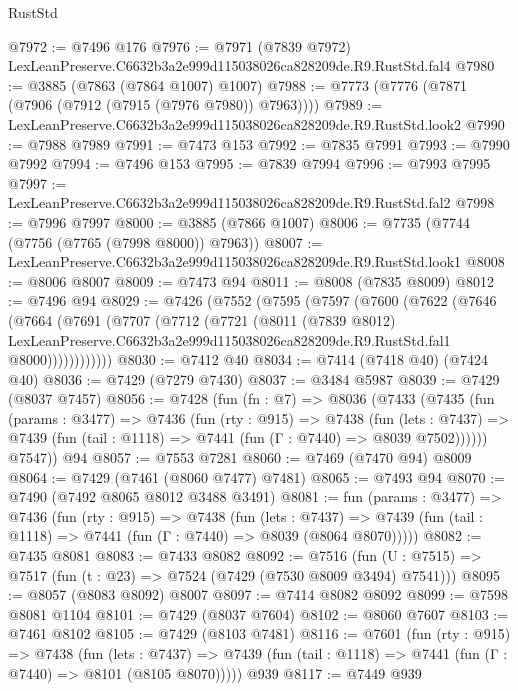 \begin{lexlean}{RustStd}
\begin{coremodule}
@7972 := @7496 @176
@7976 := @7971 (@7839 @7972) LexLeanPreserve.C6632b3a2e999d115038026ca828209de.R9.RustStd.fal4
@7980 := @3885 (@7863 (@7864 @1007) @1007)
@7988 := @7773 (@7776 (@7871 (@7906 (@7912 (@7915 (@7976 @7980)) @7963))))
@7989 := LexLeanPreserve.C6632b3a2e999d115038026ca828209de.R9.RustStd.look2
@7990 := @7988 @7989
@7991 := @7473 @153
@7992 := @7835 @7991
@7993 := @7990 @7992
@7994 := @7496 @153
@7995 := @7839 @7994
@7996 := @7993 @7995
@7997 := LexLeanPreserve.C6632b3a2e999d115038026ca828209de.R9.RustStd.fal2
@7998 := @7996 @7997
@8000 := @3885 (@7866 @1007)
@8006 := @7735 (@7744 (@7756 (@7765 (@7998 @8000)) @7963))
@8007 := LexLeanPreserve.C6632b3a2e999d115038026ca828209de.R9.RustStd.look1
@8008 := @8006 @8007
@8009 := @7473 @94
@8011 := @8008 (@7835 @8009)
@8012 := @7496 @94
@8029 := @7426
    (@7552
      (@7595
        (@7597
          (@7600
            (@7622
              (@7646
                (@7664
                  (@7691
                    (@7707
                      (@7712
                        (@7721
                          (@8011
                            (@7839 @8012)
                            LexLeanPreserve.C6632b3a2e999d115038026ca828209de.R9.RustStd.fal1
                            @8000))))))))))))
@8030 := @7412 @40
@8034 := @7414 (@7418 @40) (@7424 @40)
@8036 := @7429 (@7279 @7430)
@8037 := @3484 @5987
@8039 := @7429 (@8037 @7457)
@8056 := @7428
    (fun (fn : @7) =>
    @8036
      (@7433
        (@7435
          (fun (params : @3477) =>
          @7436
            (fun (rty : @915) =>
            @7438
              (fun (lets : @7437) =>
              @7439 (fun (tail : @1118) => @7441 (fun (Γ : @7440) => @8039 @7502))))))
        @7547))
    @94
@8057 := @7553 @7281
@8060 := @7469 (@7470 @94) @8009
@8064 := @7429 (@7461 (@8060 @7477) @7481)
@8065 := @7493 @94
@8070 := @7490 (@7492 @8065 @8012 @3488 @3491)
@8081 := fun (params : @3477) =>
  @7436
    (fun (rty : @915) =>
    @7438
      (fun (lets : @7437) =>
      @7439 (fun (tail : @1118) => @7441 (fun (Γ : @7440) => @8039 (@8064 @8070)))))
@8082 := @7435 @8081
@8083 := @7433 @8082
@8092 := @7516 (fun (U : @7515) => @7517 (fun (t : @23) => @7524 (@7429 (@7530 @8009 @3494) @7541)))
@8095 := @8057 (@8083 @8092) @8007
@8097 := @7414 @8082 @8092
@8099 := @7598 @8081 @1104
@8101 := @7429 (@8037 @7604)
@8102 := @8060 @7607
@8103 := @7461 @8102
@8105 := @7429 (@8103 @7481)
@8116 := @7601
    (fun (rty : @915) =>
    @7438
      (fun (lets : @7437) =>
      @7439 (fun (tail : @1118) => @7441 (fun (Γ : @7440) => @8101 (@8105 @8070)))))
    @939
@8117 := @7449 @939

\end{coremodule}
\end{lexlean}
